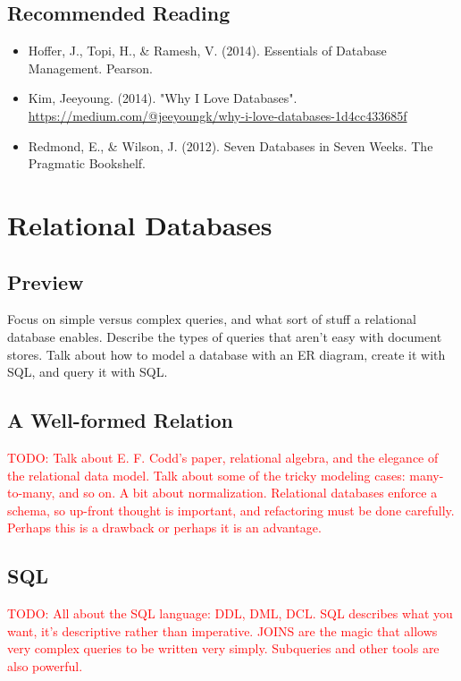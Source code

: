 \documentclass[11pt]{book}
\newcommand{\todo}[1]{\textcolor{red}{TODO: #1}} %
\begin{document}
\section*{Recommended Reading}
\begin{itemize}
    \item Hoffer, J., Topi, H., \& Ramesh, V. (2014). Essentials of Database Management. Pearson.
    \item Kim, Jeeyoung. (2014). "Why I Love Databases". \url{https://medium.com/@jeeyoungk/why-i-love-databases-1d4cc433685f}
    \item Redmond, E., \& Wilson, J. (2012). Seven Databases in Seven Weeks.  The Pragmatic Bookshelf.
\end{itemize}









\chapter{Relational Databases}\label{ch:sql}

\section*{Preview}

Focus on simple versus complex queries, and what sort of stuff a relational database enables.  Describe the types of queries that aren't easy with document stores.  Talk about how to model a database with an ER diagram, create it with SQL, and query it with SQL.

\section{A Well-formed Relation}
\todo{Talk about E. F. Codd's paper, relational algebra, and the elegance of the relational data model.  Talk about some of the tricky modeling cases: many-to-many, and so on.  A bit about normalization.  Relational databases enforce a schema, so up-front thought is important, and refactoring must be done carefully.  Perhaps this is a drawback or perhaps it is an advantage.}

\section{SQL}
\todo{All about the SQL language: DDL, DML, DCL.  SQL describes what you want, it's descriptive rather than imperative.  JOINS are the magic that allows very complex queries to be written very simply.  Subqueries and other tools are also powerful.}
\end{document}
